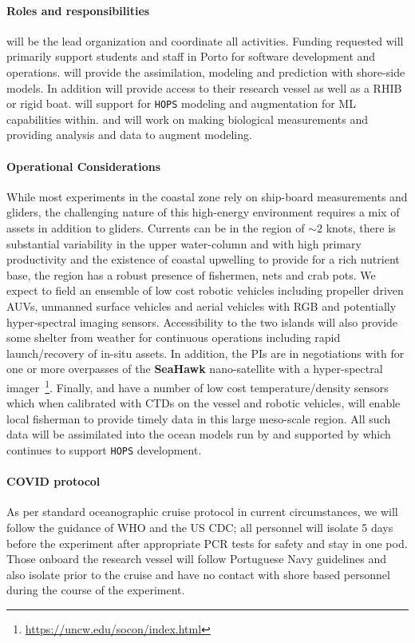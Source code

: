 \paragraph{Roles and responsibilities} \univ will be the lead
organization and coordinate all activities. Funding requested will
primarily support students and staff in Porto for software development
and operations. \inst will provide the assimilation, modeling and
prediction with shore-side models. In addition \inst will provide
access to their research vessel as well as a RHIB or rigid boat. \mit
will support \inst for \texttt{HOPS} modeling and augmentation for ML
capabilities within. \colo and \ave will work on making biological
measurements and providing analysis and data to augment \inst
modeling. 

\paragraph{Operational Considerations} While most experiments in the
coastal zone rely on ship-board measurements and gliders, the
challenging nature of this high-energy environment requires a mix of
assets in addition to gliders. Currents can be in the region of
$\sim 2$ knots, there is substantial variability in the upper
water-column and with high primary productivity and the existence of
coastal upwelling to provide for a rich nutrient base, the region has
a robust presence of fishermen, nets and crab pots. We expect to field
an ensemble of low cost robotic vehicles including propeller driven
AUVs, unmanned surface vehicles and aerial vehicles with RGB and
potentially hyper-spectral imaging sensors. Accessibility to the two
islands will also provide some shelter from weather for continuous
operations including rapid launch/recovery of in-situ assets. In
addition, the PIs are in negotiations with \nas for one or more
overpasses of the \textbf{SeaHawk} nano-satellite with a
hyper-spectral
imager~\footnote{\url{https://uncw.edu/socon/index.html}}. Finally,
\univ and \inst have a number of low cost temperature/density sensors
which when calibrated with CTDs on the vessel and robotic vehicles,
will enable local fisherman to provide timely data in this large
meso-scale region. All such data will be assimilated into the ocean
models run by \inst and supported by  which continues to support
\texttt{HOPS} development.

\paragraph{COVID protocol} As per standard oceanographic cruise
protocol in current circumstances, we will follow the guidance of WHO
and the US CDC; all personnel will isolate 5 days before the
experiment after appropriate PCR tests for safety and stay in one
pod. Those onboard the \inst research vessel will follow Portuguese
Navy guidelines and also isolate prior to the cruise and have no
contact with shore based personnel during the course of the
experiment.

